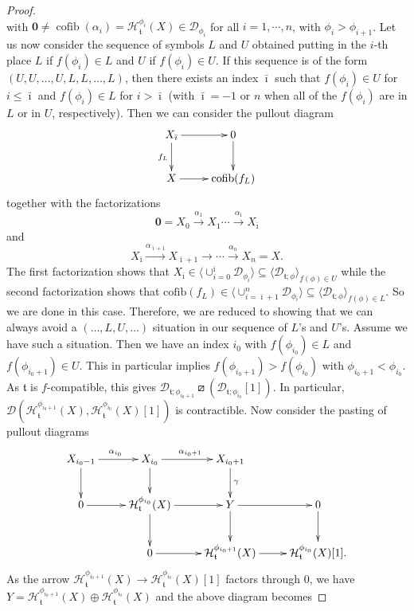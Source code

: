 \documentclass{article}
\theoremstyle{definition}
\newcommand{\tee}{\mathfrak{t}}
\newcommand{\orth}{\boxslash}
\DeclareMathOperator{\cofib}{cofib}
\begin{document}
\begin{proof}
\[\]
with $\mathbf{0} \neq \cofib(\alpha_i)=\mathcal{H}_{\tee}^{\phi_i}(X) \in \mathscr{D}_{\phi_i}$ for all $i = 1, \cdots, n$, with $\phi_i>\phi_{i+1}$. Let us now consider the sequence of symbols $L$ and $U$ obtained putting in the $i$-th place $L$ if $f(\phi_i)\in L$ and $U$ if $f(\phi_i)\in U$. If this sequence is of the form $(U,U,\dots,U,L,L,\dots,L)$, then there exists an index $\bar{\imath}$ such that
 $f(\phi_{i})\in U$ for $i\leq \bar{\imath}$ and $f(\phi_{i})\in L$ for $i>\bar{\imath}$ (with ${\bar\imath}=-1$ or $n$ when all of the $f(\phi_i)$ are in $L$ or in $U$, respectively). Then we can
consider the pullout diagram
\[
\xymatrix{
X_{{\bar\imath}}\ar[r]\ar[d]_{f_{L}}&0\ar[d]\\
X\ar[r]&\mathrm{cofib}(f_{L})
}\]
together with the factorizations
\[
\mathbf{0}=X_0 \xrightarrow{\alpha_1} X_1\cdots \xrightarrow{\alpha_{{\bar\imath}}}X_{{\bar\imath}} 
\]
and
\[
X_{{\bar\imath}}\xrightarrow{\alpha_{{\bar\imath}+1}}X_{{\bar\imath}+1}\xrightarrow{}\cdots \xrightarrow{\alpha_n} X_n=X.
\]
The first factorization shows that $X_{{\bar\imath}}\in \langle\cup_{i=0}^{{\bar\imath}}\mathscr{D}_{\phi_i}\rangle\subseteq \langle \mathscr{D}_{\tee;\phi}\rangle_{f(\phi)\in U}$ while the second factorization shows that $\mathrm{cofib}(f_{L})\in  \langle\cup_{i={\bar\imath}+1}^n\mathscr{D}_{\phi_i}\rangle\subseteq \langle \mathscr{D}_{\tee;\phi}\rangle_{f(\phi)\in L}$. So we are done in this case. Therefore, we are reduced to showing that we can always avoid a $(\dots,L,U,\dots)$ situation in our sequence of $L$'s and $U$'s. Assume we have such a situation. Then we have an index $i_0$ with $f(\phi_{i_0})\in L$ and $f(\phi_{{i_0}+1})\in U$. This in particular implies $f(\phi_{{i_0}+1})>f(\phi_{i_0})$ with $\phi_{{i_0}+1}<\phi_{i_0}$. As $\tee$ is $f$-compatible, this gives $\mathscr{D}_{\tee; \phi_{i_0+1}}\orth (\mathscr{D}_{\tee;\phi_{i_0}}[1])$. In particular, $\mathscr{D}(\mathcal{H}^{\phi_{i_0+1}}_{\tee}(X),\mathcal{H}^{\phi_{i_0}}_{\tee}(X)[1])$ is contractible. Now consider the pasting of pullout diagrams
\[
\xymatrix{X_{i_0-1}\ar[r]^{\alpha_{i_0}}\ar[d] & X_{i_0}\ar[r]^{\alpha_{i_0+1}}\ar[d] & X_{i_0+1}\ar[d]^{\gamma}\\
0\ar[r]&\mathcal{H}^{\phi_{i_0}}_{\tee}(X)\ar[d]\ar[r]&Y\ar[d]\ar[r] &0\ar[d]\\
&0\ar[r]&\mathcal{H}^{\phi_{i_0+1}}_{\tee}(X)\ar[r]&\mathcal{H}^{\phi_{i_0}}_{\tee}(X)[1].
}
\]
As the arrow $\mathcal{H}^{\phi_{i_0+1}}_{\tee}(X)\to \mathcal{H}^{\phi_{i_0}}_{\tee}(X)[1]$ factors through $0$, we have $Y=\mathcal{H}^{\phi_{i_0+1}}_{\tee}(X)\oplus \mathcal{H}^{\phi_{i_0}}_{\tee}(X)$ and the above diagram becomes

\end{proof}
\end{document}
